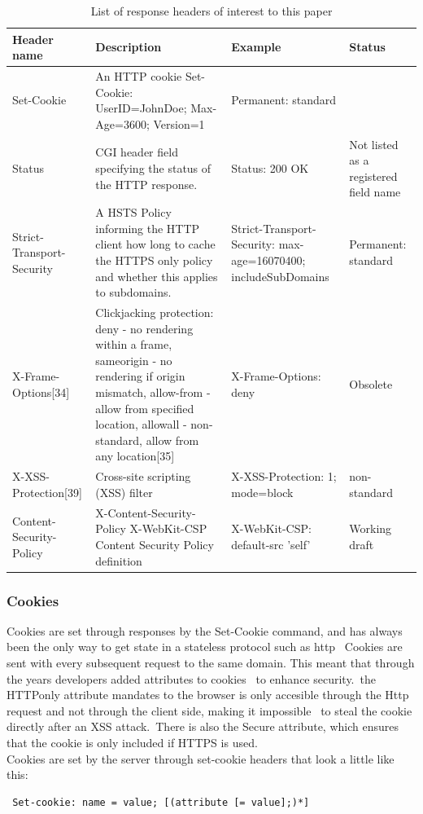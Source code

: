 \documentclass[a4paper,12pt]{paper}
\begin{document}
\begin{table}[H]
\centering
\begin{tabular}{p{2cm}|p{6cm}|p{4cm}|p{2cm}}
Header name & Description & Example & Status \\\hline
Set-Cookie &	An HTTP cookie 	Set-Cookie: UserID=JohnDoe; Max-Age=3600; Version=1 &Permanent: standard\\
Status &CGI header field specifying the status of the HTTP response. &	Status: 200 OK 	& Not listed as a registered field name\\
Strict-Transport-Security & A HSTS Policy informing the HTTP client how long to cache the HTTPS only policy and whether this applies to subdomains. &Strict-Transport-Security: max-age=16070400; includeSubDomains &Permanent: standard\\
X-Frame-Options[34] &Clickjacking protection: deny - no rendering within a frame, sameorigin - no rendering if origin mismatch, allow-from - allow from specified location, allowall - non-standard, allow from any location[35] &X-Frame-Options: deny &Obsolete\\
X-XSS-Protection[39] &Cross-site scripting (XSS) filter &X-XSS-Protection: 1; mode=block& non-standard \\
Content-Security-Policy &X-Content-Security-Policy X-WebKit-CSP Content Security Policy definition& X-WebKit-CSP: default-src 'self' & Working draft
\end{tabular}
\caption{\label{tab:resp}List of response headers of interest to this paper}
\end{table}

\subsubsection{Cookies}
\label{cookie}
Cookies are set through responses by the Set-Cookie command, and has always been the only way to get state in a stateless protocol such as http \
Cookies are sent with every subsequent request to the same domain. This meant that through the years developers added attributes to cookies \
to enhance security.\
the HTTPonly attribute mandates to the browser is only accesible through the Http request and not through the client side, making it impossible \
to steal the cookie directly after an XSS attack.\
There is also the Secure attribute, which ensures that the cookie is only included if HTTPS is used.\\

Cookies are set by the server through set-cookie headers that look a little like this: \
\begin{verbatim}
 Set-cookie: name = value; [(attribute [= value];)*]
\end{verbatim}
\end{document}
